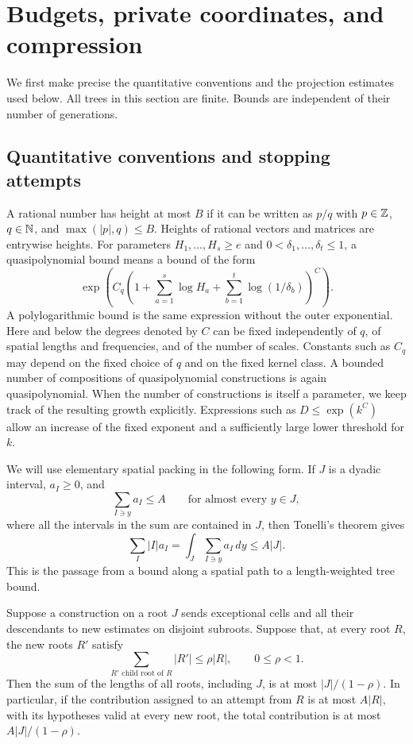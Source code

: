 \section{Budgets, private coordinates, and compression}
\label{sec:compression}

We first make precise the quantitative conventions and the projection estimates
used below.  All trees in this section are finite.  Bounds are independent of
their number of generations.

\subsection{Quantitative conventions and stopping attempts}

A rational number has height at most $B$ if it can be written as $p/q$ with
$p\in\mathbb Z$, $q\in\mathbb N$, and $\max(|p|,q)\le B$.  Heights of rational vectors and
matrices are entrywise heights.  For parameters $H_1,\ldots,H_s\ge e$ and
$0<\delta_1,\ldots,\delta_t\le1$, a quasipolynomial bound means a bound of the
form
\[
 \exp\!\left(C_q\left(1+\sum_{a=1}^s\log H_a
                  +\sum_{b=1}^t\log(1/\delta_b)\right)^C\right).
\]
A polylogarithmic bound is the same expression without the outer exponential.
Here and below the degrees denoted by $C$ can be fixed independently of $q$,
of spatial lengths and frequencies, and of the number of scales.  Constants
such as $C_q$ may depend on the fixed choice of $q$ and on the fixed kernel
class.  A bounded number of compositions of quasipolynomial constructions is
again quasipolynomial.  When the number of constructions is itself a parameter,
we keep track of the resulting growth explicitly.  Expressions such as
$D\le\exp(k^C)$ allow an increase of the fixed exponent and a sufficiently
large lower threshold for $k$.

We will use elementary spatial packing in the following form.  If $J$ is a
dyadic interval, $a_I\ge0$, and
\[
 \sum_{I\ni y}a_I\le A \qquad\text{for almost every }y\in J,
\]
where all the intervals in the sum are contained in $J$, then Tonelli's
theorem gives
\[
 \sum_I |I|a_I
   =\int_J\sum_{I\ni y}a_I\,dy\le A|J|.
\]
This is the passage from a bound along a spatial path to a length-weighted
tree bound.

\begin{lemma}
\label{lem:attempt-packing}
Suppose a construction on a root $J$ sends exceptional cells and all their
descendants to new estimates on disjoint subroots.  Suppose that, at every
root $R$, the new roots $R'$ satisfy
\[
 \sum_{R'\text{ child root of }R}|R'|\le\rho |R|,
 \qquad 0\le\rho<1.
\]
Then the sum of the lengths of all roots, including $J$, is at most
$|J|/(1-\rho)$.  In particular, if the contribution assigned to an attempt
from $R$ is at most $A|R|$, with its hypotheses valid at every new root, the
total contribution is at most $A|J|/(1-\rho)$.
\end{lemma}

